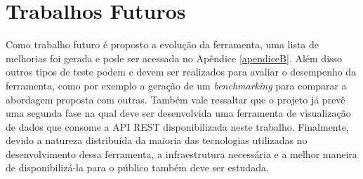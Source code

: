 \section{Trabalhos Futuros}
\label{sec:trablhos}

Como trabalho futuro é proposto a evolução da ferramenta, uma lista de melhorias foi gerada
e pode ser acessada no Apêndice \ref{apendiceB}. Além disso outros tipos de teste podem e 
devem ser realizados para avaliar o desempenho da ferramenta, como por exemplo a geração de 
um \textit{benchmarking} para comparar a abordagem proposta com outras. Também vale ressaltar
que o projeto já prevê uma segunda fase na qual deve ser desenvolvida uma ferramenta de 
visualização de dados que consome a API REST disponibilizada neste trabalho. Finalmente, devido a 
natureza distribuída da maioria das tecnologias utilizadas no desenvolvimento dessa ferramenta, 
a infraestrutura necessária e a melhor maneira de disponibilizá-la para o público também deve 
ser estudada.


